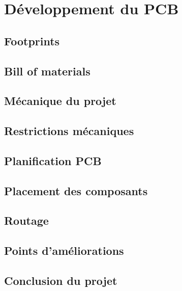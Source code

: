 \section{Développement du PCB}

\subsection{Footprints} \label{ssec:Footprints}
{}
\clearpage

\subsection{Bill of materials} \label{ssec:BOM}
{}
\clearpage

\subsection{Mécanique du projet} \label{ssec:mechProjet}
{}
\clearpage

\subsection{Restrictions mécaniques} \label{ssec:RestrictionMech}
{}
\clearpage

\subsection{Planification PCB} \label{ssec:planifPCB}
{}
\clearpage

\subsection{Placement des composants} \label{ssec:placementComp}
{}
\clearpage

\subsection{Routage} \label{ssec:routage}
{}
\clearpage

\subsection{Points d'améliorations} \label{ssec:pointAmel}
{}
\clearpage

\subsection{Conclusion du projet} \label{ssec:conclusionG}
{}
\clearpage